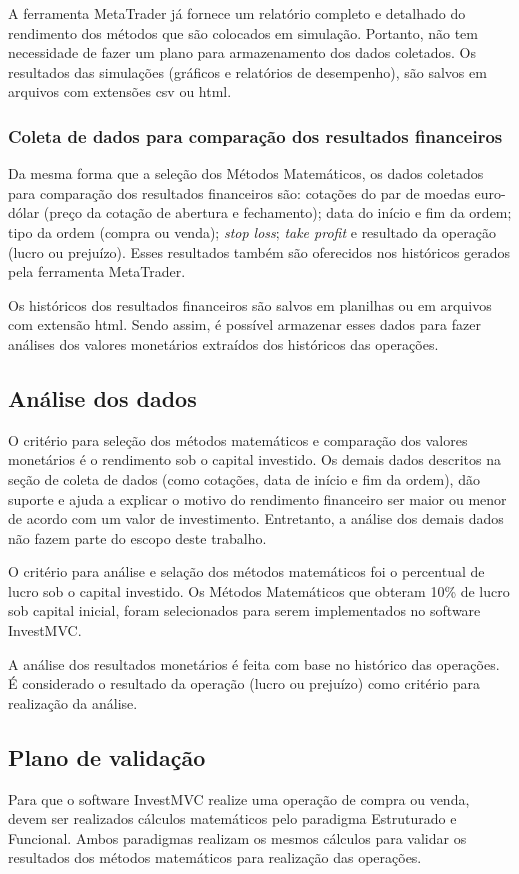 A ferramenta MetaTrader já fornece um relatório completo e detalhado do rendimento dos métodos que são colocados em simulação. Portanto, não tem necessidade de fazer um plano para armazenamento dos dados coletados. Os resultados das simulações (gráficos e relatórios de desempenho), são salvos em arquivos com extensões csv ou html.

\subsubsection{Coleta de dados para comparação dos resultados financeiros}
Da mesma forma que a seleção dos Métodos Matemáticos, os dados coletados para comparação dos resultados financeiros são: cotações do par de moedas euro-dólar (preço da cotação de abertura e fechamento); data do início e fim da ordem; tipo da ordem (compra ou venda); \textit{stop loss}; \textit{take profit} e resultado da operação (lucro ou prejuízo). Esses resultados também são oferecidos nos históricos gerados pela ferramenta MetaTrader.

Os históricos dos resultados financeiros são salvos em planilhas ou em arquivos com extensão html. Sendo assim, é possível armazenar esses dados para fazer análises dos valores monetários extraídos dos históricos das operações.

\subsection{Análise dos dados}
O critério para seleção dos métodos matemáticos e comparação dos valores monetários é o rendimento sob o capital investido. Os demais dados descritos na seção de coleta de dados (como cotações, data de início e fim da ordem), dão suporte e ajuda a explicar o motivo do rendimento financeiro ser maior ou menor de acordo com um valor de investimento. Entretanto, a análise dos demais dados não fazem parte do escopo deste trabalho.

O critério para análise e selação dos métodos matemáticos foi o percentual de lucro sob o capital investido. Os Métodos Matemáticos que obteram 10\% de lucro sob capital inicial, foram selecionados para serem implementados no software InvestMVC. 

A análise dos resultados monetários é feita com base no histórico das operações. É considerado o resultado da operação (lucro ou prejuízo) como critério para realização da análise.

\subsection{Plano de validação} 
Para que o software InvestMVC realize uma operação de compra ou venda, devem ser realizados cálculos matemáticos pelo paradigma Estruturado e Funcional. Ambos paradigmas realizam os mesmos cálculos para validar os resultados dos métodos matemáticos para realização das operações. 

